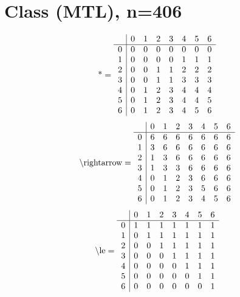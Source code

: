 \documentclass[11pt]{article}
\begin{document}
\section{Class (MTL), n=406}
\[\text{*} = 
\begin{array}{r | r r r r r r r}
 & 0 & 1 & 2 & 3 & 4 & 5 & 6 \\ \hline
0 & 0 & 0 & 0 & 0 & 0 & 0 & 0 \\
1 & 0 & 0 & 0 & 0 & 1 & 1 & 1 \\
2 & 0 & 0 & 1 & 1 & 2 & 2 & 2 \\
3 & 0 & 0 & 1 & 1 & 3 & 3 & 3 \\
4 & 0 & 1 & 2 & 3 & 4 & 4 & 4 \\
5 & 0 & 1 & 2 & 3 & 4 & 4 & 5 \\
6 & 0 & 1 & 2 & 3 & 4 & 5 & 6 \\
\end{array}
\]
\[\text{\textbackslash rightarrow} = 
\begin{array}{r | r r r r r r r}
 & 0 & 1 & 2 & 3 & 4 & 5 & 6 \\ \hline
0 & 6 & 6 & 6 & 6 & 6 & 6 & 6 \\
1 & 3 & 6 & 6 & 6 & 6 & 6 & 6 \\
2 & 1 & 3 & 6 & 6 & 6 & 6 & 6 \\
3 & 1 & 3 & 3 & 6 & 6 & 6 & 6 \\
4 & 0 & 1 & 2 & 3 & 6 & 6 & 6 \\
5 & 0 & 1 & 2 & 3 & 5 & 6 & 6 \\
6 & 0 & 1 & 2 & 3 & 4 & 5 & 6 \\
\end{array}
\]
\[\text{\textbackslash le} = 
\begin{array}{r | r r r r r r r}
 & 0 & 1 & 2 & 3 & 4 & 5 & 6 \\ \hline
0 & 1 & 1 & 1 & 1 & 1 & 1 & 1 \\
1 & 0 & 1 & 1 & 1 & 1 & 1 & 1 \\
2 & 0 & 0 & 1 & 1 & 1 & 1 & 1 \\
3 & 0 & 0 & 0 & 1 & 1 & 1 & 1 \\
4 & 0 & 0 & 0 & 0 & 1 & 1 & 1 \\
5 & 0 & 0 & 0 & 0 & 0 & 1 & 1 \\
6 & 0 & 0 & 0 & 0 & 0 & 0 & 1 \\
\end{array}
\]
\end{document}
